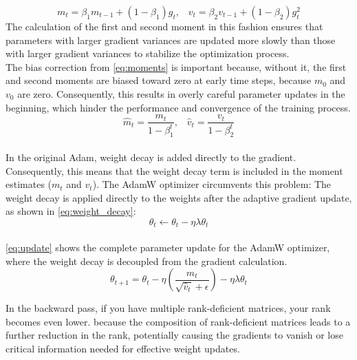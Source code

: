 \begin{equation}
\label{eq:mean_var}
m_t = \beta_1 m_{t-1} + (1 - \beta_1) g_t \text{,} \quad v_t = \beta_2 v_{t-1} + (1 - \beta_2) g_t^2
\end{equation}
The calculation of the first and second moment in this fashion ensures that parameters with larger gradient variances are updated more slowly than those with larger gradient variances to stabilize the optimization process. \\
The bias correction from \cref{eq:moments} is important because, without it, the first and second moments are biased toward zero at early time steps, because \(m_0\) and \(v_0\) are zero. Consequently, this results in overly careful parameter updates in the beginning, which hinder the performance and convergence of the training process. \\
\begin{equation}
\hat{m}_t = \frac{m_t}{1 - \beta_1^t} \text{,} \quad \hat{v}_t = \frac{v_t}{1 - \beta_2^t}
\label{eq:moments}
\end{equation}
\\
In the original Adam, weight decay is added directly to the gradient. Consequently, this means that the weight decay term is included in the moment estimates (\(m_t\) and \(v_t\)). The AdamW optimizer circumvents this problem: The weight decay is applied directly to the weights after the adaptive gradient update, as shown in \cref{eq:weight_decay}:
\begin{equation}
\label{eq:weight_decay}
\theta_t \leftarrow \theta_t - \eta \lambda \theta_t
\end{equation}
\\
\cref{eq:update} shows the complete parameter update for the AdamW optimizer, where the weight decay is decoupled from the gradient calculation.
\begin{equation}
\label{eq:update}
\theta_{t+1} = \theta_t - \eta \left( \frac{\hat{m}_t}{\sqrt{\hat{v}_t} + \epsilon} \right) - \eta \lambda \theta_t
\end{equation}




In the backward pass, if you have multiple rank-deficient matrices, your rank becomes even lower.
because the composition of rank-deficient matrices leads to a further reduction in the rank, potentially causing the gradients to vanish or lose critical information needed for effective weight updates.
